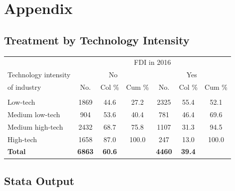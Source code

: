 \documentclass[a4paper,11pt]{scrartcl}
\begin{document}
\appendix
\section{Appendix}

\subsection{Treatment by Technology Intensity}
\label{app:tech}
\begin{table}[htbp]
	\centering
\begin{threeparttable}

\begin{tabular}{lcccccc} 
\hline
\hline
 & \multicolumn{6}{c}{FDI in 2016} \\
Technology intensity & \multicolumn{3}{c}{No} & \multicolumn{3}{c}{Yes} \\
of industry &No.&Col \% &Cum \% &No.&Col \% &Cum \% \\
\hline
	&  &  &  &  &  &   \\
Low-tech &1869&44.6&27.2&2325&55.4&52.1 \\
Medium low-tech &904&53.6&40.4&781&46.4&69.6 \\
Medium high-tech &2432&68.7&75.8&1107&31.3&94.5 \\
High-tech &1658&87.0&100.0&247&13.0&100.0 \\
\textbf{Total}&\textbf{6863}&\textbf{60.6}&&\textbf{4460}&\textbf{39.4}& \\
\hline
\hline
\end{tabular}

\end{threeparttable}
\end{table}

\subsection{Stata Output}
\label{app:logfile}
\end{document}
